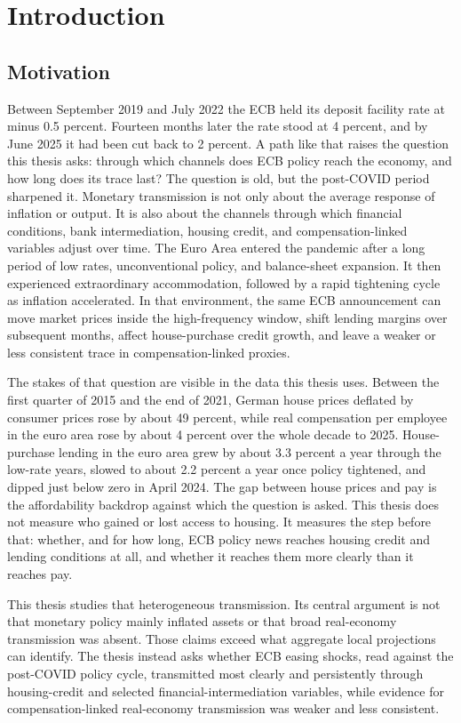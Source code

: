 \chapter{Introduction}
\label{chap:introduction}

\section{Motivation}

Between September 2019 and July 2022 the ECB held its deposit facility rate at minus 0.5 percent. Fourteen months later the rate stood at 4 percent, and by June 2025 it had been cut back to 2 percent. A path like that raises the question this thesis asks: through which channels does ECB policy reach the economy, and how long does its trace last? The question is old, but the post-COVID period sharpened it. Monetary transmission is not only about the average response of inflation or output. It is also about the channels through which financial conditions, bank intermediation, housing credit, and compensation-linked variables adjust over time. The Euro Area entered the pandemic after a long period of low rates, unconventional policy, and balance-sheet expansion. It then experienced extraordinary accommodation, followed by a rapid tightening cycle as inflation accelerated. In that environment, the same ECB announcement can move market prices inside the high-frequency window, shift lending margins over subsequent months, affect house-purchase credit growth, and leave a weaker or less consistent trace in compensation-linked proxies.

The stakes of that question are visible in the data this thesis uses. Between the first quarter of 2015 and the end of 2021, German house prices deflated by consumer prices rose by about 49 percent, while real compensation per employee in the euro area rose by about 4 percent over the whole decade to 2025. House-purchase lending in the euro area grew by about 3.3 percent a year through the low-rate years, slowed to about 2.2 percent a year once policy tightened, and dipped just below zero in April 2024. The gap between house prices and pay is the affordability backdrop against which the question is asked. This thesis does not measure who gained or lost access to housing. It measures the step before that: whether, and for how long, ECB policy news reaches housing credit and lending conditions at all, and whether it reaches them more clearly than it reaches pay.

This thesis studies that heterogeneous transmission. Its central argument is not that monetary policy mainly inflated assets or that broad real-economy transmission was absent. Those claims exceed what aggregate local projections can identify. The thesis instead asks whether ECB easing shocks, read against the post-COVID policy cycle, transmitted most clearly and persistently through housing-credit and selected financial-intermediation variables, while evidence for compensation-linked real-economy transmission was weaker and less consistent.

